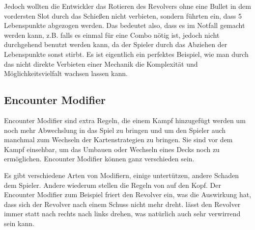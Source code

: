 Jedoch wollten die Entwickler das Rotieren des Revolvers ohne eine Bullet in dem vordersten Slot durch das Schießen nicht verbieten, sondern führten ein,
dass 5 Lebenspunkte abgezogen werden. Das bedeutet also, dass es im Notfall gemacht werden kann, z.B. falls es einmal für
eine Combo nötig ist, jedoch nicht durchgehend benutzt werden kann, da der Spieler durch das Abziehen der Lebenspunkte sonst stirbt.
Es ist eigentlich ein perfektes Beispiel, wie man durch das nicht direkte Verbieten einer Mechanik die Komplexität und
Möglichkeitsvielfalt wachsen lassen kann.


\subsection{Encounter Modifier}\label{encounter_modifier}


Encounter Modifier sind extra Regeln, die einem Kampf hinzugefügt werden um noch mehr Abwechslung in das Spiel zu bringen
und um den Spieler auch manchmal zum Wechseln der Kartenstrategien zu bringen.
Sie sind vor dem Kampf einsehbar, um das Umbauen oder Wechseln eines Decks noch zu ermöglichen.
Encounter Modifier können ganz verschieden sein.

Es gibt verschiedene Arten von Modifiern, einige untertützen, andere Schaden dem Spieler. Andere wiederum stellen die Regeln von \FF auf den Kopf.
Der Encounter Modifier  zum Beispiel friert den Revolver ein, was die Auswirkung hat, dass sich der Revolver  nach einem Schuss nicht mehr dreht.
 lässt den Revolver immer statt nach rechts nach links drehen, was natürlich auch sehr verwirrend sein kann.

\renewcommand{\kapitelautor}{}
